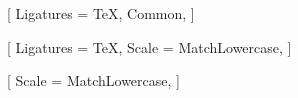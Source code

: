 %

\usepackage[english]{babel}
\usepackage[english=american]{csquotes}

\usepackage{amsmath}
\usepackage{amssymb}
\usepackage{mathtools}
\usepackage{amsthm}
\usepackage{unicode-math}

%
%
\setmainfont{STIX Two Text}[
  Ligatures = {TeX, Common},
]

\setsansfont{Latin Modern Sans}[
  Ligatures = TeX,
  Scale     = MatchLowercase,
]

\setmonofont{Latin Modern Mono}[
  Scale = MatchLowercase,
]

\providecommand{\lt}{<}
\providecommand{\gt}{>}

